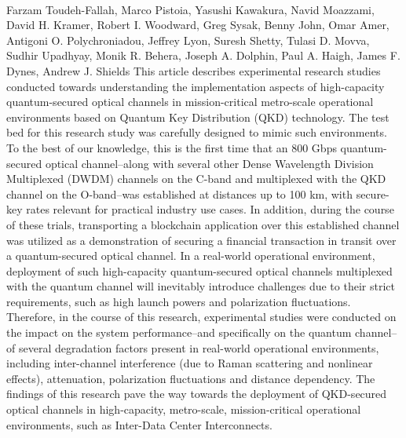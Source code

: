 \documentclass{article}%
\begin{document}
\paragraph{}%
Farzam Toudeh{-}Fallah, Marco Pistoia, Yasushi Kawakura, Navid Moazzami, David H. Kramer, Robert I. Woodward, Greg Sysak, Benny John, Omar Amer, Antigoni O. Polychroniadou, Jeffrey Lyon, Suresh Shetty, Tulasi D. Movva, Sudhir Upadhyay, Monik R. Behera, Joseph A. Dolphin, Paul A. Haigh, James F. Dynes, Andrew J. Shields%
This article describes experimental research studies conducted towards understanding the implementation aspects of high-capacity quantum-secured optical channels in mission-critical metro-scale operational environments based on Quantum Key Distribution (QKD) technology. The test bed for this research study was carefully designed to mimic such environments. To the best of our knowledge, this is the first time that an 800 Gbps quantum-secured optical channel--along with several other Dense Wavelength Division Multiplexed (DWDM) channels on the C-band and multiplexed with the QKD channel on the O-band--was established at distances up to 100 km, with secure-key rates relevant for practical industry use cases. In addition, during the course of these trials, transporting a blockchain application over this established channel was utilized as a demonstration of securing a financial transaction in transit over a quantum-secured optical channel. In a real-world operational environment, deployment of such high-capacity quantum-secured optical channels multiplexed with the quantum channel will inevitably introduce challenges due to their strict requirements, such as high launch powers and polarization fluctuations. Therefore, in the course of this research, experimental studies were conducted on the impact on the system performance--and specifically on the quantum channel--of several degradation factors present in real-world operational environments, including inter-channel interference (due to Raman scattering and nonlinear effects), attenuation, polarization fluctuations and distance dependency. The findings of this research pave the way towards the deployment of QKD-secured optical channels in high-capacity, metro-scale, mission-critical operational environments, such as Inter-Data Center Interconnects.

%
\end{document}
